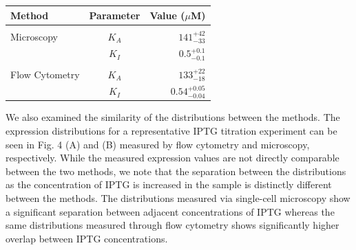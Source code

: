 \documentclass[letterpaper, 10pt]{article}
\begin{document}
\begin{table}
\begin{tabular}{lcr}
  \textbf{Method} & \textbf{Parameter} & \textbf{Value ($\mu$M)}\\
  \hline\\
  Microscopy & $K_A$ & $141^{+42}_{-33}$\\
   & $K_I$ & $0.5^{+0.1}_{-0.1}$\\
  \hline \\
  Flow Cytometry & $K_A$ & $133^{+22}_{-18}$\\
  & $K_I$ & $0.54^{+0.05}_{-0.04}$\\
  \hline
\end{tabular}
\end{table}

\begin{figure}
  \label{fig:parameter_estimation}
\end{figure}

We also examined the similarity of the distributions between the
methods. The expression distributions for a representative IPTG titration experiment
can be seen in Fig. 4 (A) and (B) measured by flow cytometry and microscopy,
respectively. While the measured expression values are not directly comparable
between the two methods, we note that the separation between the
distributions as the concentration of IPTG is increased in the sample is distinctly
different between the methods. The distributions measured via single-cell microscopy show a significant
separation between adjacent concentrations of IPTG whereas the same distributions
measured through flow cytometry shows significantly higher overlap between
IPTG concentrations.
\end{document}
